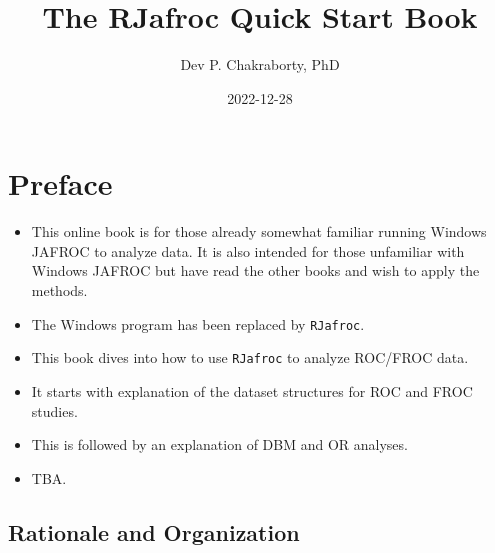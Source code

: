 \documentclass[
]{book}
\title{The RJafroc Quick Start Book}
\author{Dev P. Chakraborty, PhD}
\date{2022-12-28}
\providecommand{\tightlist}{%
  \setlength{\itemsep}{0pt}\setlength{\parskip}{0pt}}
\begin{document}
\maketitle

{
\setcounter{tocdepth}{1}
\tableofcontents
}
\hypertarget{quick-start-index-preface}{%
\chapter{Preface}\label{quick-start-index-preface}}

\begin{itemize}
\tightlist
\item
  This online book is for those already somewhat familiar running Windows JAFROC to analyze data. It is also intended for those unfamiliar with Windows JAFROC but have read the other books and wish to apply the methods.
\item
  The Windows program has been replaced by \texttt{RJafroc}.
\item
  This book dives into how to use \texttt{RJafroc} to analyze ROC/FROC data.
\item
  It starts with explanation of the dataset structures for ROC and FROC studies.
\item
  This is followed by an explanation of DBM and OR analyses.
\item
  TBA.
\end{itemize}

\hypertarget{quick-start-index-rationale-and-organization}{%
\section{Rationale and Organization}\label{quick-start-index-rationale-and-organization}}
\end{document}
